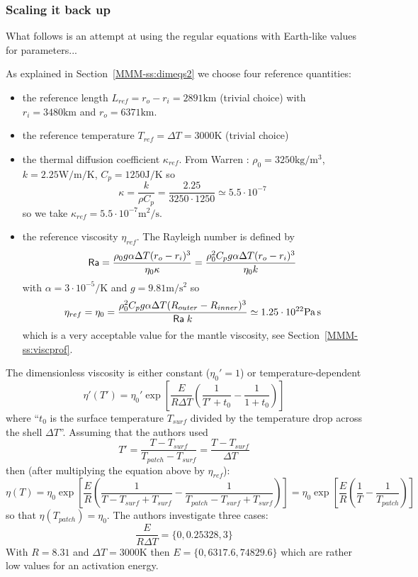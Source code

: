 \subsubsection*{Scaling it back up}

What follows is an attempt at using the regular equations with Earth-like values for parameters...

As explained in Section~\ref{MMM-ss:dimeqs2} we choose four reference quantities:
\begin{itemize}
\item the reference length $L_{ref}=r_o-r_i=2891\si{\kilo\metre}$ (trivial choice)
with $r_i=3480\si{\km}$ and $r_o=6371\si{\km}$.


\item the reference temperature $T_{ref}=\Delta T = 3000\si{\kelvin}$ (trivial choice)

\item the thermal diffusion coefficient $\kappa_{ref}$. From Warren \etal \cite{wabj08}:
$\rho_0=3250\si{\kg\per\cubic\metre}$,  $k=2.25 \si{\watt\per\metre\per\kelvin}$,  $C_p=1250 \si{\joule\per\kelvin}$
so 
\[
\kappa = \frac{k}{\rho C_p} =	\frac{2.25}{3250 \cdot 1250} \simeq 5.5\cdot 10^{-7} 
\]
so we take $\kappa_{ref} = 5.5\cdot 10^{-7} \si{\square\metre\per\second}$.

\item the reference viscosity $\eta_{ref}$. The Rayleigh number is defined by
\[
{\mathsf{Ra}} 
= \frac{\rho_0 g \alpha \Delta T (r_o-r_i)^3}{\eta_0 \kappa}
=\frac{\rho_0^2 C_p g \alpha \Delta T (r_o-r_i)^3}{\eta_0 k}
\]
with $\alpha=3\cdot 10^{-5} \si{\per\kelvin}$ and $g=9.81\si{\metre\per\square\second}$
so 
\[
\eta_{ref}=\eta_0 =\frac{\rho_0^2 C_p g \alpha \Delta T (R_{outer}-R_{inner})^3}{{\mathsf{Ra}} \; k}
\simeq 1.25 \cdot 10^{22}\si{\pascal\second}
\]
which is a very acceptable value for the mantle viscosity, see Section~\ref{MMM-ss:viscprof}.
\end{itemize}

\noindent The dimensionless viscosity is either constant ($\eta_0'=1$) or temperature-dependent 
\[
\eta'(T')
=\eta_0' \exp\left[ \frac{E}{R \Delta T} \left( \frac{1}{T'+t_0} -\frac{1}{1+t_0}  \right)   \right]
\]
where ``$t_0$ is the surface temperature $T_{surf}$ divided by 
the temperature drop across the shell $\Delta T$''.
Assuming that the authors used 
\[
T'=\frac{T-T_{surf}}{T_{patch}-T_{surf}}= \frac{T-T_{surf}}{\Delta T}
\]
then (after multiplying the equation above by $\eta_{ref}$): 
\[
\eta(T)
=\eta_0 \exp\left[ \frac{E}{R} \left( \frac{1}{T-T_{surf}  + T_{surf}} 
-\frac{1}{T_{patch}-T_{surf} + T_{surf}}  \right)   \right]
=\eta_0 \exp\left[ \frac{E}{R} \left( \frac{1}{T} -\frac{1}{T_{patch}}\right) \right]
\]
so that $\eta(T_{patch})=\eta_0$. The authors investigate three cases:
\[
\frac{E}{R \Delta T} = \{0,0.25328,3\}
\]
With $R=8.31$ and $\Delta T=3000\si{\kelvin}$ then $E=\{ 0, 6317.6 , 74829.6 \}$ which 
are rather low values for an activation energy. 


